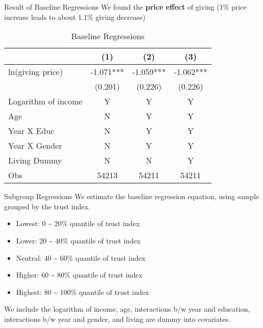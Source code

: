 \documentclass[
  ignorenonframetext,
]{beamer}
\providecommand{\tightlist}{%
  \setlength{\itemsep}{0pt}\setlength{\parskip}{0pt}}
\begin{document}
\begin{frame}{Result of Baseline Regressions}
\protect\hypertarget{result-of-baseline-regressions}{}
We found the \textbf{price effect} of giving (1\% price increase leads
to about 1.1\% giving decrease)

\begin{table}

\caption{\label{tab:kableTabBaseReg}Baseline Regressions}
\centering
\begin{tabular}[t]{lccc}
\toprule
 & (1) & (2) & (3)\\
\midrule
ln(giving price) & -1.071*** & -1.059*** & -1.062***\\
 & (0.201) & (0.226) & (0.226)\\
Logarithm of income & Y & Y & Y\\
Age & N & Y & Y\\
Year X Educ & N & Y & Y\\
Year X Gender & N & Y & Y\\
Living Dummy & N & N & Y\\
Obs & 54213 & 54211 & 54211\\
\bottomrule
\end{tabular}
\end{table}
\end{frame}

\begin{frame}{Subgroup Regressions}
\protect\hypertarget{subgroup-regressions}{}
We estimate the baseline regression equation, using sample grouped by
the trust index.

\begin{itemize}
\tightlist
\item
  Lowest: 0 \textasciitilde{} 20\% quantile of trust index
\item
  Lower: 20 \textasciitilde{} 40\% quantile of trust index
\item
  Neutral: 40 \textasciitilde{} 60\% quantile of trust index
\item
  Higher: 60 \textasciitilde{} 80\% quantile of trust index
\item
  Highest: 80 \textasciitilde{} 100\% quantile of trust index
\end{itemize}

We include the logarithm of income, age, interactions b/w year and
education, interactions b/w year and gender, and living are dummy into
covariates.
\end{frame}
\end{document}
